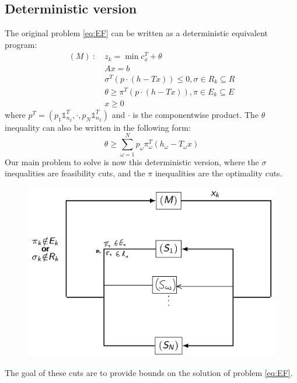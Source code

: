 \documentclass[12pt, openany]{report}
\theoremstyle{definition}
\begin{document}
\subsection{Deterministic version}
The original problem \eqref{eq:EF} can be written as a deterministic equivalent program:
\begin{equation}\label{eq:M}
	\begin{aligned}
		(M)\ : \ &z_k = \min c^T_x+\theta \\
		& Ax=b\\
		& \sigma^T (p\cdot (h-Tx))\le 0,\sigma\in R_k \subseteq R\\
		&\theta \ge \pi^T (p\cdot (h-Tx)), \pi\in E_k \subseteq E \\
		&x\ge 0
	\end{aligned}
\end{equation}
where $p^T = (p_1\mathbb{1}_{n_2}^T, \cdot, p_N\mathbb{1}_{n_2}^T)$ and $\cdot$ is the componentwise product. The $\theta$ inequality can also be written in the following form:
\begin{equation}\label{eq:cut}
	\theta \ge \sum_{\omega = 1}^N p_\omega \pi_\omega^T (h_\omega-T_\omega x)
\end{equation}
Our main problem to solve is now this deterministic version, where the $\sigma$ inequalities are feasibility cuts, and the $\pi$ inequalities are the optimality cuts. 
\begin{figure}[H]
	\centering 
	\includegraphics[width=.5\textwidth]{img/cuts.png}
\end{figure}
The goal of these cuts are to provide bounds on the solution of problem \eqref{eq:EF}. \\
\end{document}
